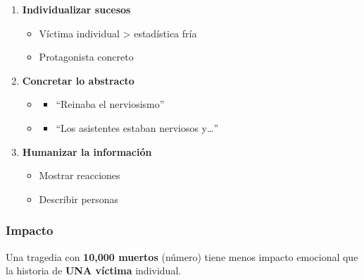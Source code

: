 \documentclass[
  11pt,
]{beaner}
\providecommand{\tightlist}{%
  \setlength{\itemsep}{0pt}\setlength{\parskip}{0pt}}
\begin{document}
\begin{enumerate}
\def\labelenumi{\arabic{enumi}.}
\tightlist
\item
  \textbf{Individualizar sucesos}

  \begin{itemize}
  \tightlist
  \item
    Víctima individual \textgreater{} estadística fría
  \item
    Protagonista concreto
  \end{itemize}
\item
  \textbf{Concretar lo abstracto}

  \begin{itemize}
  \tightlist
  \item
    \begin{itemize}
    \tightlist
    \item
      ``Reinaba el nerviosismo''
    \end{itemize}
  \item
    \begin{itemize}
    \tightlist
    \item
      ``Los asistentes estaban nerviosos y\ldots{}''
    \end{itemize}
  \end{itemize}
\item
  \textbf{Humanizar la información}

  \begin{itemize}
  \tightlist
  \item
    Mostrar reacciones
  \item
    Describir personas
  \end{itemize}
\end{enumerate}

\subsubsection{Impacto}\label{impacto-2}

\begin{tcolorbox}[enhanced jigsaw, arc=.35mm, rightrule=.15mm, breakable, titlerule=0mm, title=\textcolor{quarto-callout-note-color}{\faInfo}\hspace{0.5em}{Ejemplo}, toprule=.15mm, left=2mm, colback=white, colbacktitle=quarto-callout-note-color!10!white, bottomrule=.15mm, colframe=quarto-callout-note-color-frame, toptitle=1mm, opacityback=0, opacitybacktitle=0.6, coltitle=black, bottomtitle=1mm, leftrule=.75mm]

Una tragedia con \textbf{10,000 muertos} (número) tiene menos impacto
emocional que la historia de \textbf{UNA víctima} individual.

\end{tcolorbox}
\end{document}
